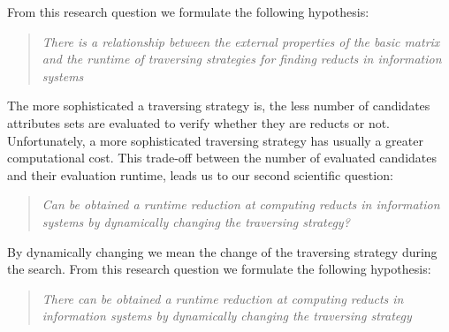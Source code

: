 \documentclass[authoryear,11pt]{elsarticle}
\begin{document}
  From this research question we formulate the following hypothesis:
  
\begin{quote}  
  \emph{There is a relationship between the external properties of the basic matrix and the runtime 
  		of traversing strategies for finding reducts in information systems}
\end{quote}
  		
%  
%
%    
  
  The more sophisticated a traversing strategy is, the less number of candidates attributes sets are 
  evaluated to verify whether they are reducts or not. Unfortunately, a more sophisticated traversing 
  strategy has usually a greater computational cost. This trade-off between the number of evaluated 
  candidates and their evaluation runtime, leads us to our second scientific question:
  
\begin{quote}
  \emph{Can be obtained a runtime reduction at computing reducts in information systems by 
  		dynamically changing the traversing strategy?}
\end{quote}
  By dynamically changing we mean the change of the traversing strategy during the search.
  From this research question we formulate the following hypothesis:
    
\begin{quote}
  \emph{There can be obtained a runtime reduction at computing reducts in 
  		information systems by dynamically changing the traversing strategy}
\end{quote}
\end{document}
